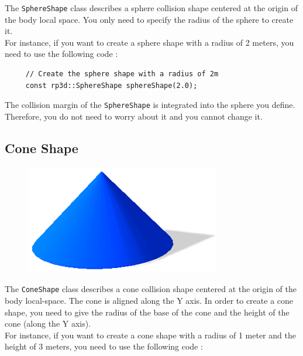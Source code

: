 \documentclass[a4paper,12pt]{article}
\begin{document}
    The \texttt{SphereShape} class describes a sphere collision shape centered at the origin of the body local space. You only need to specify the radius of the sphere to create it. \\

    For instance, if you want to create a sphere shape with a radius of 2 meters, you need to use the following code : \\

    \begin{lstlisting}
     // Create the sphere shape with a radius of 2m
     const rp3d::SphereShape sphereShape(2.0);
  \end{lstlisting}

    \vspace{0.6cm}

    The collision margin of the \texttt{SphereShape} is integrated into the sphere you define. Therefore, you do not need to worry about it and you cannot change it.

    \subsection{Cone Shape}

    \begin{figure}[h]
        \centering
        \includegraphics{coneshape.png}
        \label{fig:coneshape}
    \end{figure}

    The \texttt{ConeShape} class describes a cone collision shape centered at the origin of the body local-space. The cone is aligned along the Y axis.
    In order to create a cone shape, you need to give the radius of the base of the cone and the height of the cone (along the Y axis). \\

    For instance, if you want to create a cone shape with a radius of 1 meter and the height of 3 meters, you need to use the following code : \\
\end{document}
